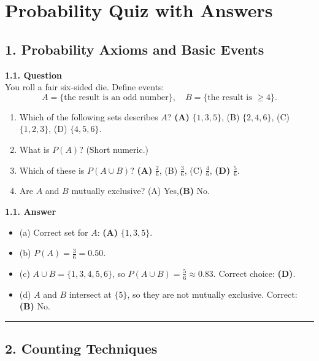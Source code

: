 \documentclass[12pt]{article}
\begin{document}
\section*{Probability Quiz with Answers}

\subsection*{1. Probability Axioms and Basic Events}
\noindent
\textbf{1.1. Question}\\
You roll a fair six-sided die. Define events:
\[
  A = \{\text{the result is an odd number}\}, \quad
  B = \{\text{the result is } \ge 4\}.
\]
\begin{enumerate}[label=(\alph*)]
\item Which of the following sets describes $A$?  
  \textbf{(A)} $\{1,3,5\}$,\quad 
  (B) $\{2,4,6\}$,\quad 
  (C) $\{1,2,3\}$,\quad 
  (D) $\{4,5,6\}$.
\item What is $P(A)$? (Short numeric.)
\item Which of these is $P(A \cup B)$?  
  \textbf{(A)} $\tfrac{2}{6}$,\quad 
  (B) $\tfrac{3}{6}$,\quad
  (C) $\tfrac{4}{6}$,\quad 
  \textbf{(D)} $\tfrac{5}{6}.$
\item Are $A$ and $B$ mutually exclusive?  
  (A) Yes,\quad \textbf{(B)} No.
\end{enumerate}

\noindent
\textbf{1.1. Answer}
\begin{itemize}
\item (a) Correct set for $A$: \textbf{(A)} $\{1,3,5\}$.
\item (b) $P(A)=\tfrac{3}{6} = 0.50.$
\item (c) $A \cup B = \{1,3,4,5,6\}$, so $P(A\cup B)=\tfrac{5}{6}\approx 0.83.$ 
  Correct choice: \textbf{(D)}.
\item (d) $A$ and $B$ intersect at $\{5\}$, so they are not mutually exclusive. 
  Correct: \textbf{(B)} No.
\end{itemize}

\hrule

\subsection*{2. Counting Techniques}
\end{document}
